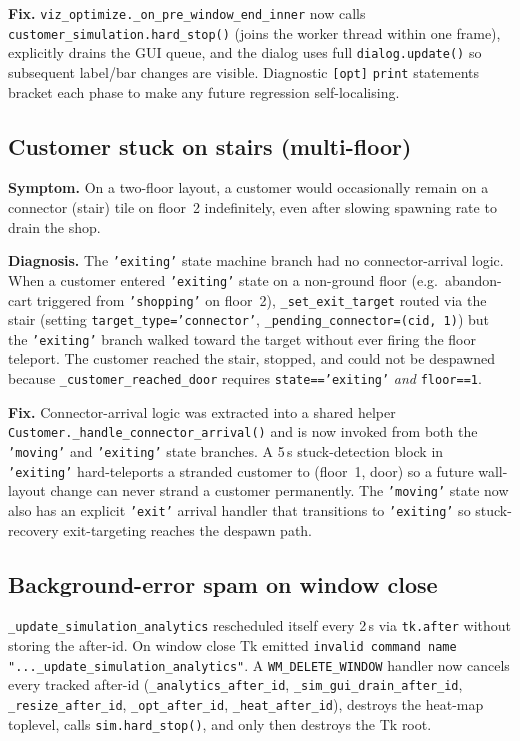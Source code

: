 \documentclass[11pt]{article}
\begin{document}
\textbf{Fix.} \texttt{viz\_optimize.\_on\_pre\_window\_end\_inner}
now calls \texttt{customer\_simulation.hard\_stop()} (joins the worker
thread within one frame), explicitly drains the GUI queue, and the
dialog uses full \texttt{dialog.update()} so subsequent label/bar
changes are visible. Diagnostic \texttt{[opt]} \texttt{print}
statements bracket each phase to make any future regression
self-localising.

\subsection{Customer stuck on stairs (multi-floor)}
\label{sec:stairs-bug}

\textbf{Symptom.} On a two-floor layout, a customer would occasionally
remain on a connector (stair) tile on floor~2 indefinitely, even after
slowing spawning rate to drain the shop.

\textbf{Diagnosis.} The \texttt{'exiting'} state machine branch had no
connector-arrival logic. When a customer entered \texttt{'exiting'}
state on a non-ground floor (e.g.\ abandon-cart triggered from
\texttt{'shopping'} on floor~2), \texttt{\_set\_exit\_target}
routed via the stair (setting \texttt{target\_type='connector'},
\texttt{\_pending\_connector=(cid,\,1)}) but the \texttt{'exiting'}
branch walked toward the target without ever firing the floor
teleport. The customer reached the stair, stopped, and could not be
despawned because \texttt{\_customer\_reached\_door} requires
\texttt{state=='exiting'} \emph{and} \texttt{floor==1}.

\textbf{Fix.} Connector-arrival logic was extracted into a shared
helper \texttt{Customer.\_handle\_connector\_arrival()} and is now
invoked from both the \texttt{'moving'} and \texttt{'exiting'}
state branches. A 5\,s stuck-detection block in \texttt{'exiting'}
hard-teleports a stranded customer to (floor~1, door) so a future
wall-layout change can never strand a customer permanently. The
\texttt{'moving'} state now also has an explicit \texttt{'exit'}
arrival handler that transitions to \texttt{'exiting'} so stuck-
recovery exit-targeting reaches the despawn path.

\subsection{Background-error spam on window close}

\texttt{\_update\_simulation\_analytics} rescheduled itself every
2\,s via \texttt{tk.after} without storing the after-id. On window
close Tk emitted
\verb|invalid command name "..._update_simulation_analytics"|.
A \texttt{WM\_DELETE\_WINDOW} handler now cancels every tracked
after-id (\texttt{\_analytics\_after\_id}, \texttt{\_sim\_gui\_drain\_after\_id},
\texttt{\_resize\_after\_id}, \texttt{\_opt\_after\_id},
\texttt{\_heat\_after\_id}), destroys the heat-map toplevel, calls
\texttt{sim.hard\_stop()}, and only then destroys the Tk root.
\end{document}
